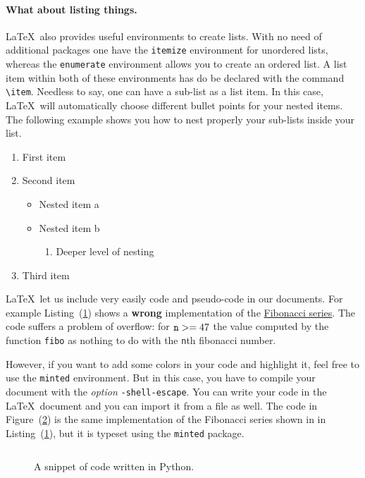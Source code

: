 \documentclass{article}
\newcommand{\latex}{\LaTeX}
\begin{document}
\paragraph{What about listing things.} \latex\ also provides useful environments
to create lists. With no need of additional packages one have the {\tt itemize}
environment for unordered lists, whereas the {\tt enumerate} environment allows
you to create an ordered list. A list item within both of these environments has
do be declared with the command \verb+\item+. Needless to say, one can have a
sub-list as a list item. In this case, \latex\ will automatically choose
different bullet points for your nested items. The following example shows you
how to nest properly your sub-lists inside your list.

\begin{enumerate}
  \item First item
  \item Second item
  \begin{itemize}
    \item Nested item a
    \item Nested item b
    \begin{enumerate}
      \item Deeper level of nesting
    \end{enumerate}
  \end{itemize}
  \item Third item
\end{enumerate}

\latex\  let us include very easily code and pseudo-code in our documents.
For example Listing~(\ref{fibo}) shows a {\bfseries wrong} implementation
of the \href{https://en.wikipedia.org/wiki/Fibonacci\_number}{Fibonacci series}.
The code suffers a problem of overflow: for ${\tt n} >= 47$ the value
computed by the function {\tt fibo} as nothing to do with the {\tt n}th fibonacci number.

\begin{figure} \label{fibo}
\hrulefill
  \hrulefill
\end{figure}

However, if you want to add some colors in your code and highlight it, feel free
to use the {\tt minted} environment. But in this case, you have to compile your
document with the {\em option} {\tt -shell-escape}. You can write your code in
the \latex\ document and you can import it from a file as well. The
code in Figure~(\ref{fibo-minted}) is the same implementation of the
Fibonacci series shown in in Listing~(\ref{fibo}), but it is typeset using the {\tt minted} package.

\begin{figure}
\hrulefill
\inputminted{python}{fibo.py}
\caption{A snippet of code written in Python.}
\label{fibo-minted}
\hrulefill
\end{figure}
\end{document}

